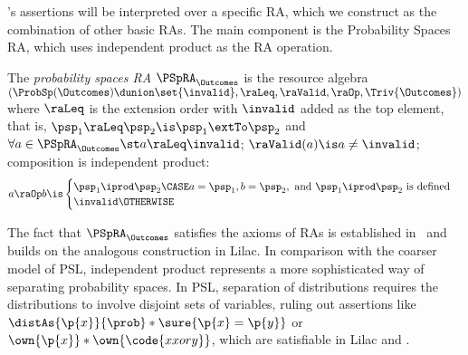 \documentclass[acmsmall,nonacm,screen,appendix]{acmart}
\begin{document}
\thelogic's assertions will be interpreted over a specific RA,
which we construct as the combination of other basic RAs.
The main component is the Probability Spaces RA,
which uses independent product as the RA operation.

\begin{definition}
  The \emph{probability spaces RA}
  $ \PSpRA_\Outcomes $
  is the resource algebra
  ${(\ProbSp(\Outcomes) \dunion \set{\invalid}, \raLeq, \raValid, \raOp, \Triv{\Outcomes})}$
  where
  $\raLeq$ is the extension order with $\invalid$ added as the top element,
  that is,
    $ \psp_1 \raLeq \psp_2 \is \psp_1 \extTo \psp_2 $ and
    $ \forall a \in \PSpRA_\Outcomes\st
        a \raLeq \invalid$;
  $\raValid(a) \is a \neq \invalid$;
  composition is independent product:\[
    a \raOp b \is
      \begin{cases}
        \psp_1 \iprod \psp_2
          \CASE a=\psp_1, b=\psp_2, \text{ and }
                \psp_1 \iprod \psp_2 \text{ is defined}
        \\
        \invalid \OTHERWISE
      \end{cases}
  \]
\end{definition}

The fact that $\PSpRA_\Outcomes$ satisfies the axioms of RAs is
established in~ and builds on the analogous
construction in Lilac.
In comparison with the coarser model of PSL,
independent product represents a more sophisticated way of separating
probability spaces.
In PSL, separation of distributions requires the distributions to
involve disjoint sets of variables, ruling out
assertions like
$ \distAs{\p{x}}{\prob} * \sure{\p{x}=\p{y}} $
or
$ \own{\p{x}} * \own{\code{x xor y}} $,
which are satisfiable in Lilac and \thelogic.
\end{document}
